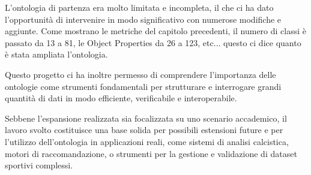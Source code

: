 \documentclass[11pt]{report} %
\begin{document}
\hfill

L'ontologia di partenza era molto limitata e incompleta, il che ci ha dato l'opportunità di intervenire in modo significativo con numerose modifiche e aggiunte. Come mostrano le metriche del capitolo precedenti, il numero di classi è passato da 13 a 81, le Object Properties da 26 a 123, etc... questo ci dice quanto è stata ampliata l'ontologia.

\hfill

Questo progetto ci ha inoltre permesso di comprendere l'importanza delle ontologie come strumenti fondamentali per strutturare e interrogare grandi quantità di dati in modo efficiente, verificabile e interoperabile.

\hfill

Sebbene l’espansione realizzata sia focalizzata su uno scenario accademico, il lavoro svolto costituisce una base solida per possibili estensioni future e per l’utilizzo dell’ontologia in applicazioni reali, come sistemi di analisi calcistica, motori di raccomandazione, o strumenti per la gestione e validazione di dataset sportivi complessi.


\printbibliography
\end{document}
